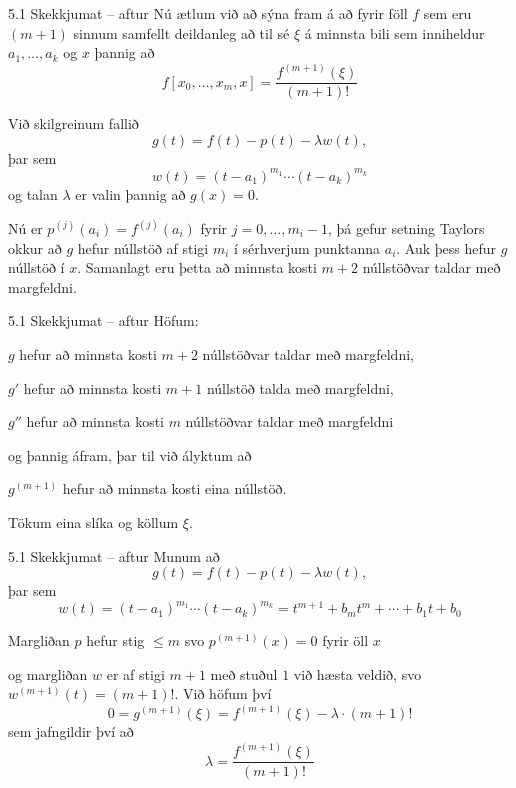 \begin{frame}{5.1 Skekkjumat -- aftur} 
Nú ætlum við að sýna fram á að fyrir föll $f$ sem eru $(m+1)$ sinnum 
samfellt deildanleg að til sé $\xi$ á minnsta bili sem inniheldur 
$a_1, \ldots, a_k$ og $x$ þannig að
\begin{equation*}
  f[x_0,\ldots,x_m,x] = \frac{f^{(m+1)}(\xi)}{(m+1)!}
\end{equation*}

\pause
\smallskip
Við skilgreinum fallið
\begin{equation*}
  g(t) = f(t) - p(t) - \lambda w(t),
\end{equation*}
þar sem
\begin{equation*}
  w(t) = (t-a_1)^{m_1} \cdots (t-a_k)^{m_k}
\end{equation*}
og talan $\lambda$ er valin þannig að $g(x) = 0$. 

\pause
\smallskip
Nú er $p^{(j)}(a_i)=f^{(j)}(a_i)$  fyrir $j=0,\dots,m_i-1$,   
þá gefur setning Taylors okkur að $g$
hefur núllstöð  af stigi $m_i$ í sérhverjum punktanna $a_i$.
Auk þess hefur $g$ núllstöð í $x$.  Samanlagt eru þetta  að minnsta
kosti 
$m+2$ núllstöðvar taldar með margfeldni.
\end{frame}

\begin{frame}{5.1 Skekkjumat -- aftur} 
 Höfum:

\smallskip
$g$ hefur  að minnsta kosti $m+2$ núllstöðvar taldar með margfeldni,

\pause
\smallskip
$g'$ hefur  að minnsta kosti $m+1$ núllstöð talda með margfeldni,


\pause
\smallskip
$g''$ hefur  að minnsta kosti $m$ núllstöðvar taldar með margfeldni 

\pause
\smallskip
og þannig áfram, þar til við ályktum að 


\pause
\smallskip
$g^{(m+1)}$ hefur  að minnsta kosti eina  núllstöð.  

\pause
\smallskip
Tökum eina slíka og köllum $\xi$.
\end{frame}

\begin{frame}{5.1 Skekkjumat -- aftur} 
Munum að 
\begin{equation*}
  g(t) = f(t) - p(t) - \lambda w(t),
\end{equation*}
þar sem
\begin{equation*}
  w(t) = (t-a_1)^{m_1} \cdots (t-a_k)^{m_k}=t^{m+1}+b_mt^m+\cdots+b_1t+b_0
\end{equation*}

\pause
\smallskip
Margliðan $p$ hefur stig $\leq m$ svo $p^{(m+1)}(x) = 0$  fyrir öll
$x$ 

\pause
og margliðan $w$ er af stigi $m+1$ með stuðul $1$ við hæsta veldið,
svo $w^{(m+1)}(t) = (m+1)!$. Við höfum því
\begin{equation*}
  0 = g^{(m+1)}(\xi) = f^{(m+1)}(\xi) - \lambda \cdot (m+1)!
\end{equation*}
sem jafngildir því að
$$
\lambda =\dfrac{f^{(m+1)}(\xi)}{(m+1)!}
$$
\end{frame}

